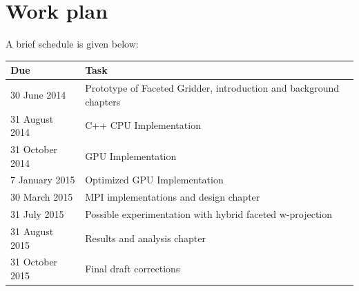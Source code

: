 \documentclass[a4paper, two column]{article}
\begin{document}
\section{Work plan}
A brief schedule is given below:\\
\begin{tabular}{|p{2.5cm}|p{5cm}|}
 \hline
 \textbf{Due} & \textbf{Task} \\
 \hline
 30 June 2014 & Prototype of Faceted Gridder, introduction and background chapters\\
 \hline
 31 August 2014 & C++ CPU Implementation\\
 \hline
 31 October 2014 & GPU Implementation\\
 \hline
 7 January 2015 & Optimized GPU Implementation\\
 \hline
 30 March 2015 & MPI implementations and design chapter\\
 \hline
 31 July 2015 & Possible experimentation with hybrid faceted w-projection\\
 \hline
 31 August 2015 & Results and analysis chapter\\
 \hline
 31 October 2015 & Final draft corrections \\
 \hline
\end{tabular}
{
{\footnotesize }

}
\end{document}
